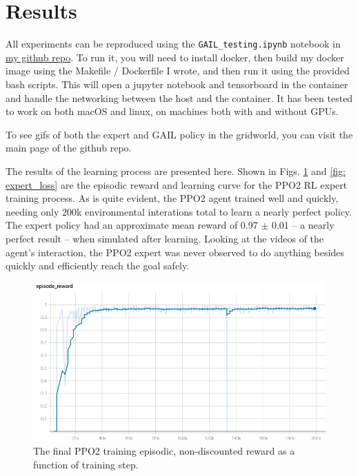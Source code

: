 \section{Results}

All experiments can be reproduced using the \texttt{GAIL\_testing.ipynb} notebook in \href{https://github.com/nicholasRenninger/GAIL-Formal_Methods}{my github repo}. To run it, you will need to install docker, then build my docker image using the Makefile / Dockerfile I wrote, and then run it using the provided bash scripts. This will open a jupyter notebook and tensorboard in the container and handle the networking between the host and the container. It has been tested to work on both macOS and linux, on machines both with and without GPUs.

To see gifs of both the expert and GAIL policy in the gridworld, you can visit the main page of the github repo.

The results of the learning process are presented here. Shown in Figs. \ref{fig: expert_rew} and \ref{fig: expert_loss} are the episodic reward and learning curve for the PPO2 RL expert training process. As is quite evident, the PPO2 agent trained well and quickly, needing only 200k environmental interations total to learn a nearly perfect policy. The expert policy had an approximate mean reward of 0.97 $\pm$ 0.01 -- a nearly perfect result -- when simulated after learning. Looking at the videos of the agent's interaction, the PPO2 expert was never observed to do anything besides quickly and efficiently reach the goal safely.

\begin{figure}[htbp]
\centerline{\includegraphics[width=\linewidth]{Figures/expert_reward.png}}
\caption{The final PPO2 training episodic, non-discounted reward as a function of training step.}
\label{fig: expert_rew}
\end{figure}

